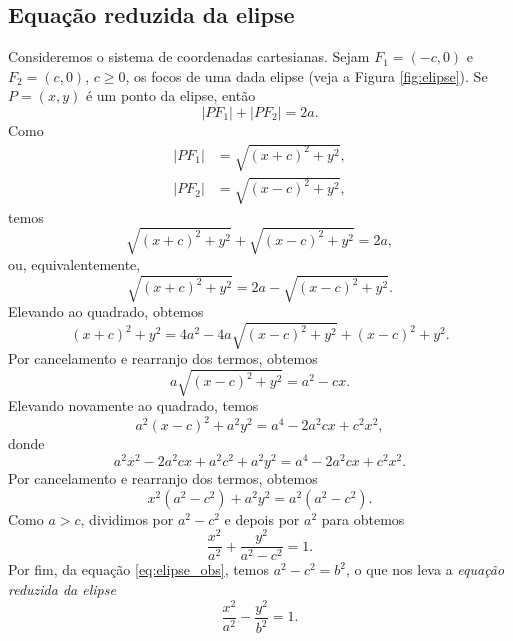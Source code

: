 \subsection{Equação reduzida da elipse}

Consideremos o sistema de coordenadas cartesianas. Sejam $F_1=(-c,0)$ e $F_2=(c,0)$, $c\geq 0$, os focos de uma dada elipse (veja a Figura \ref{fig:elipse}).  Se $P=(x,y)$ é um ponto da elipse, então
\begin{equation}
  |PF_1| + |PF_2| = 2a.
\end{equation}
Como
\begin{align}
  |PF_1| &= \sqrt{(x+c)^2 + y^2}, \\
  |PF_2| &= \sqrt{(x-c)^2 + y^2},
\end{align}
temos
\begin{equation}
  \sqrt{(x+c)^2 + y^2} + \sqrt{(x-c)^2 + y^2} = 2a,
\end{equation}
ou, equivalentemente,
\begin{equation}
  \sqrt{(x+c)^2 + y^2} = 2a - \sqrt{(x-c)^2 + y^2}.
\end{equation}
Elevando ao quadrado, obtemos
\begin{equation}
  (x+c)^2 + y^2 = 4a^2 - 4a\sqrt{(x-c)^2+y^2} + (x-c)^2+y^2.
\end{equation}
Por cancelamento e rearranjo dos termos, obtemos
\begin{equation}
  a\sqrt{(x-c)^2+y^2}=a^2-cx.
\end{equation}
Elevando novamente ao quadrado, temos
\begin{equation}
  a^2(x-c)^2+a^2y^2=a^4-2a^2cx+c^2x^2,
\end{equation}
donde
\begin{equation}
  a^2x^2 -2a^2cx + a^2c^2 + a^2y^2= a^4 -2a^2cx + c^2x^2.
\end{equation}
Por cancelamento e rearranjo dos termos, obtemos
\begin{equation}
  x^2(a^2 - c^2) + a^2y^2 = a^2(a^2 - c^2).
\end{equation}
Como $a>c$, dividimos por $a^2-c^2$  e depois por $a^2$ para obtemos
\begin{equation}
  \frac{x^2}{a^2} + \frac{y^2}{a^2-c^2} = 1.
\end{equation}
Por fim, da equação \eqref{eq:elipse_obs}, temos $a^2-c^2 = b^2$, o que nos leva  a \emph{equação reduzida da elipse}
\begin{equation}
  \frac{x^2}{a^2} - \frac{y^2}{b^2} = 1.
\end{equation}

